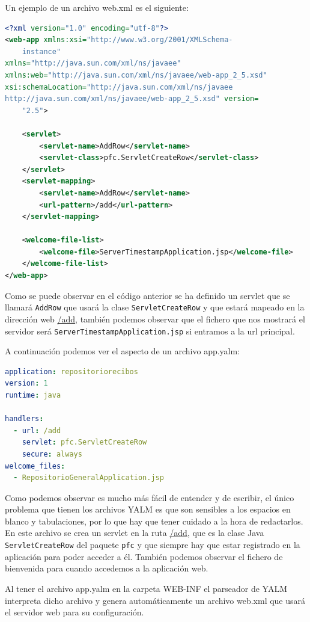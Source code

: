 \begin{itemize}
Un ejemplo de un archivo web.xml es el siguiente:

\begin{lstlisting}[language=XML]
<?xml version="1.0" encoding="utf-8"?>
<web-app xmlns:xsi="http://www.w3.org/2001/XMLSchema-
	instance"
xmlns="http://java.sun.com/xml/ns/javaee"
xmlns:web="http://java.sun.com/xml/ns/javaee/web-app_2_5.xsd"
xsi:schemaLocation="http://java.sun.com/xml/ns/javaee
http://java.sun.com/xml/ns/javaee/web-app_2_5.xsd" version=
	"2.5">

	<servlet>
		<servlet-name>AddRow</servlet-name>
		<servlet-class>pfc.ServletCreateRow</servlet-class>
	</servlet>
	<servlet-mapping>
		<servlet-name>AddRow</servlet-name>
		<url-pattern>/add</url-pattern>
	</servlet-mapping>

	<welcome-file-list>
		<welcome-file>ServerTimestampApplication.jsp</welcome-file>
	</welcome-file-list>
</web-app>
\end{lstlisting}

Como se puede observar en el código anterior se ha definido un servlet que se llamará \lstinline{AddRow} que usará la clase \lstinline{ServletCreateRow} y que estará mapeado en la dirección web \url{/add}, también podemos observar que el fichero que nos mostrará el servidor será \lstinline{ServerTimestampApplication.jsp} si entramos a la url principal.

A continuación podemos ver el aspecto de un archivo app.yalm:

\begin{lstlisting}[language=YAML]
application: repositoriorecibos
version: 1
runtime: java

handlers:
  - url: /add
    servlet: pfc.ServletCreateRow
    secure: always
welcome_files:
  - RepositorioGeneralApplication.jsp
\end{lstlisting}

Como podemos observar es mucho más fácil de entender y de escribir, el único problema que tienen los archivos YALM es que son sensibles a los espacios en blanco y tabulaciones, por lo que hay que tener cuidado a la hora de redactarlos. En este archivo se crea un servlet en la ruta \url{/add}, que es la clase Java \lstinline{ServletCreateRow} del paquete \lstinline{pfc} y que siempre hay que estar registrado en la aplicación para poder acceder a él. También podemos observar el fichero de bienvenida para cuando accedemos a la aplicación web. 

Al tener el archivo app.yalm en la carpeta WEB-INF el parseador de YALM  interpreta dicho archivo y genera automáticamente un archivo web.xml que usará el servidor web para su configuración.


\end{itemize}
